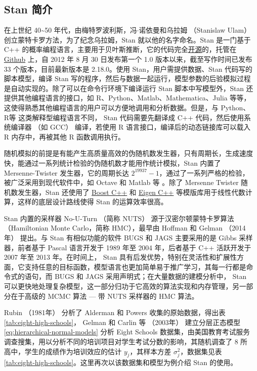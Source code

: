 \documentclass[12pt,a4paper,UTF8,twoside]{book}
\theoremstyle{definition}
\theoremstyle{definition}
\theoremstyle{definition}
\theoremstyle{remark}
\begin{document}
\hypertarget{subsec:stan-samplers}{%
\subsection{Stan 简介}\label{subsec:stan-samplers}}

在上世纪 40\textasciitilde{}50
年代，由梅特罗波利斯，冯\(\cdot\)诺依曼和乌拉姆 （Stanislaw Ulam）
创立蒙特卡罗方法，为了纪念乌拉姆，Stan 就以他的名字命名。Stan 是一门基于
C++
的概率编程语言，主要用于贝叶斯推断，它的代码完全\href{http://mc-stan.org/}{开源}的，托管在
\href{https://github.com/stan-dev/stan}{Github} 上，自 2012 年 8 月 30
日发布第一个 1.0 版本以来，截至写作时间已发布 33 个版本，目前最新版本是
2.18.0。使用 Stan，用户需提供数据、Stan 代码写的脚本模型，编译 Stan
写的程序，然后与数据一起运行，模型参数的后验模拟过程是自动实现的。除了可以在命令行环境下编译运行
Stan 脚本中写模型外，Stan 还提供其他编程语言的接口，如
R、Python、Matlab、Mathematica、Julia
等等，这使得熟悉其他编程语言的用户可以方便地调用和分析数据。但是，与
Python、R等 这类解释型编程语言不同， Stan 代码需要先翻译成 C++
代码，然后使用系统编译器 （如 GCC） 编译，若使用 R
语言接口，编译后的动态链接库可以载入 R 内存中，再被其他 R 函数调用执行。

随机模拟的前提是有能产生高质量高效的伪随机数发生器，只有周期长，生成速度快，能通过一系列统计检验的伪随机数才能用作统计模拟，Stan
内置了 Mersenne-Twister 发生器，它的周期长达
\(2^{19937}-1\)，通过了一系列严格的检验，被广泛采用到现代软件中，如
Octave 和 Matlab 等 \citep{Huang2017COS}。除了 Mersenne Twister
随机数发生器，Stan 还使用了 \href{https://www.boost.org/}{Boost C++} 和
\href{http://eigen.tuxfamily.org/index.php?title=Main_Page}{Eigen C++}
等模版库用于线性代数计算，这样的底层设计路线使得 Stan 的运算效率很高。

Stan 内置的采样器 No-U-Turn （简称 NUTS） 源于汉密尔顿蒙特卡罗算法
（Hamiltonian Monte Carlo，简称 HMC），最早由 Hoffman 和 Gelman
（2014年） \citep{hoffman2014} 提出。与 Stan 有相似功能的软件 BUGS 和
JAGS 主要采用的是 Gibbs 采样器，前者基于 Pascal 语言开发于 1989 年至
2004 年，后者基于 C++ 活跃开发于 2007 年至 2013 年。在时间上， Stan
具有后发优势，特别在灵活性和扩展性方面，它支持任意的目标函数，模型语言也更加简单易于推广学习，其每一行都是命令式的语句，而
BUGS 和 JAGS 采用声明式；在大量数据的建模分析中， Stan
可以更快地处理复杂模型，这一部分归功于它高效的算法实现和内存管理，另一部分在于高级的
MCMC 算法 --- 带 NUTS 采样器的 HMC 算法。

Rubin （1981年） \citep{Rubin1981} 分析了 Alderman 和 Powers
\citep{Alderman1980} 收集的原始数据，得出表
\ref{tab:eight-high-schools}， Gelman 和 Carlin 等 （2003年）
\citep{Gelman2003} 建立分层正态模型 \eqref{eq:hierarchical-normal-models}
分析 Eight Schools
数据集，由美国教育考试服务调查搜集，用以分析不同的培训项目对学生考试分数的影响，其随机调查了
8 所高中，学生的成绩作为培训效应的估计 \(y_j\)，其样本方差
\(\sigma^2_j\)，数据集见表
\ref{tab:eight-high-schools}。这里再次以该数据集和模型为例介绍 Stan
的使用。
\end{document}
